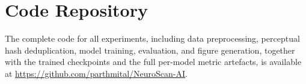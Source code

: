 \documentclass[final,3p,times,number]{elsarticle}
\begin{document}
\FloatBarrier
\appendix

\section{Code Repository}
\label{app:code}

The complete code for all experiments, including data preprocessing, perceptual hash deduplication, model training, evaluation, and figure generation, together with the trained checkpoints and the full per-model metric artefacts, is available at \url{https://github.com/parthmital/NeuroScan-AI}.
\end{document}
